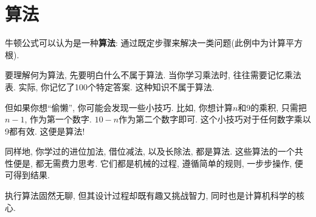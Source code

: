 \documentclass[10pt]{book}
\begin{document}
\section{算法}


牛顿公式可以认为是一种{\bf 算法}:
通过既定步骤来解决一类问题(此例中为计算平方根). 

要理解何为算法, 先要明白什么不属于算法. 
当你学习乘法时, 往往需要记忆乘法表. 
实际, 你记忆了100个特定答案. 这种知识不属于算法. 


但如果你想``偷懒'', 你可能会发现一些小技巧. 
比如, 你想计算$n$和9的乘积, 只需把$n-1$, 作为第一个数字. 
$10-n$作为第二个数字即可. 这个小技巧对于任何数字乘以9都有效. 
这便是算法!

同样地, 你学过的进位加法, 借位减法, 以及长除法, 
都是算法. 这些算法的一个共性便是, 都无需费力思考. 
它们都是机械的过程, 
遵循简单的规则, 一步步操作, 便可得到结果. 

执行算法固然无聊, 但其设计过程却既有趣又挑战智力, 
同时也是计算机科学的核心. 
\end{document}
